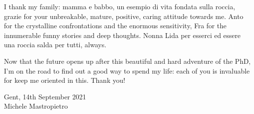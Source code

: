 I thank my family: mamma e babbo, un esempio di vita fondata sulla roccia, grazie for your unbreakable, mature, positive, caring attitude towards me.
Anto for the crystalline confrontations and the enormous sensitivity, Fra for the innumerable funny stories and deep thoughts. Nonna Lida per esserci ed essere una roccia salda per tutti, always.

Now that the future opens up after this beautiful and hard adventure of the PhD, I'm on the road to find out a good way to spend my life: each of you is invaluable for keep me oriented in this. Thank you!

\begin{flushright}
  Gent, 14th September 2021\\Michele Mastropietro
\end{flushright}